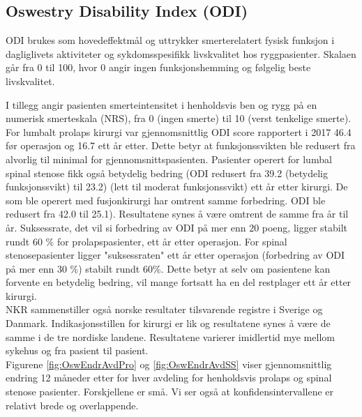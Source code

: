 \subsection{Oswestry Disability Index (ODI)}


      
      
      
      ODI brukes som hovedeffektmål og uttrykker smerterelatert  fysisk funksjon i dagliglivets aktiviteter og sykdomsspesifikk livskvalitet hos ryggpasienter. Skalaen går fra 0
til 100, hvor 0 angir ingen funksjonshemming og følgelig beste livskvalitet.

I tillegg angir pasienten smerteintensitet i henholdsvis ben og rygg på en numerisk smerteskala (NRS), 
fra 0 (ingen smerte) til 10 (verst tenkelige smerte).
\\

For lumbalt prolaps kirurgi var gjennomsnittlig ODI score rapportert i 2017 46.4 før operasjon og 16.7 ett år etter. Dette betyr at funksjonssvikten ble redusert 
fra alvorlig til minimal for gjennomsnittspasienten. 
Pasienter operert for lumbal spinal stenose fikk også
betydelig bedring (ODI redusert fra 39.2 (betydelig funksjonssvikt) til 23.2) (lett til moderat funksjonssvikt) ett år etter kirurgi. 
De som ble operert med fusjonkirurgi har
omtrent samme forbedring. ODI ble redusert fra 42.0 til 25.1). Resultatene synes å være omtrent de samme fra år til år. Suksessrate, det vil si forbedring av ODI på mer enn 20 poeng, ligger stabilt rundt 60 \% for prolapspasienter, ett år etter operasjon. 
For spinal stenosepasienter ligger "suksessraten"  ett år etter operasjon (forbedring av ODI på mer enn 30 \%) stabilt rundt 60\%.
Dette betyr at selv om
pasientene kan forvente en betydelig bedring, vil mange fortsatt ha en del restplager
ett år etter kirurgi. \\
 
 NKR
sammenstiller også norske resultater tilsvarende registre i Sverige og
Danmark. Indikasjonsstillen for kirurgi er lik og resultatene synes å være de samme i de tre nordiske landene.
Resultatene varierer imidlertid mye mellom sykehus og fra pasient til pasient. \\






      
      Figurene \ref{fig:OswEndrAvdPro} og \ref{fig:OswEndrAvdSS} viser gjennomsnittlig endring 12 måneder etter for hver avdeling for henholdsvis prolaps og spinal stenose pasienter. Forskjellene er små. Vi ser også at konfidensintervallene er relativt brede og overlappende.

